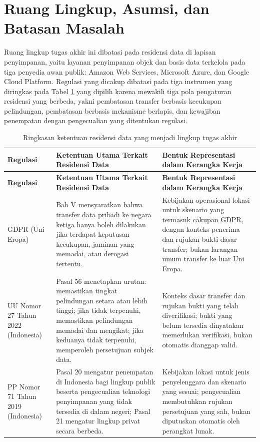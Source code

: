 \section{Ruang Lingkup, Asumsi, dan Batasan Masalah}

Ruang lingkup tugas akhir ini dibatasi pada residensi data di lapisan penyimpanan, yaitu layanan penyimpanan objek dan basis data terkelola pada tiga penyedia awan publik: Amazon Web Services, Microsoft Azure, dan Google Cloud Platform. Regulasi yang dicakup dibatasi pada tiga instrumen yang diringkas pada Tabel \ref{tab:residensi} yang dipilih karena mewakili tiga pola pengaturan residensi yang berbeda, yakni pembatasan transfer berbasis kecukupan pelindungan, pembatasan berbasis mekanisme berlapis, dan kewajiban penempatan dengan pengecualian yang ditentukan regulasi.

{\small

\begin{longtable}{|p{}|p{}|p{}|}

\caption{Ringkasan ketentuan residensi data yang menjadi lingkup tugas akhir}\label{tab:residensi}\\

\hline

\textbf{Regulasi} & \textbf{Ketentuan Utama Terkait Residensi Data} & \textbf{Bentuk Representasi dalam Kerangka Kerja} \\ \hline

\endfirsthead
\hline
\textbf{Regulasi} & \textbf{Ketentuan Utama Terkait Residensi Data} & \textbf{Bentuk Representasi dalam Kerangka Kerja} \\ \hline \endhead

GDPR (Uni Eropa) & Bab V mensyaratkan bahwa transfer data pribadi ke negara ketiga hanya boleh dilakukan jika terdapat keputusan kecukupan, jaminan yang memadai, atau derogasi tertentu. & Kebijakan operasional lokasi untuk skenario yang termasuk cakupan GDPR, dengan konteks penerima dan rujukan bukti dasar transfer; bukan larangan umum transfer ke luar Uni Eropa. \\ \hline

UU Nomor 27 Tahun 2022 (Indonesia) & Pasal 56 menetapkan urutan: memastikan tingkat pelindungan setara atau lebih tinggi; jika tidak terpenuhi, memastikan pelindungan memadai dan mengikat; jika keduanya tidak terpenuhi, memperoleh persetujuan subjek data. & Konteks dasar transfer dan rujukan bukti yang telah diverifikasi; bukti yang belum tersedia dinyatakan memerlukan verifikasi, bukan otomatis dianggap valid. \\ \hline

PP Nomor 71 Tahun 2019 (Indonesia) & Pasal 20 mengatur penempatan di Indonesia bagi lingkup publik beserta pengecualian teknologi penyimpanan yang tidak tersedia di dalam negeri; Pasal 21 mengatur lingkup privat secara berbeda. & Kebijakan lokasi untuk jenis penyelenggara dan skenario yang sesuai; pengecualian membutuhkan rujukan persetujuan yang sah, bukan diputuskan otomatis oleh perangkat lunak. \\ \hline

\end{longtable}

}

